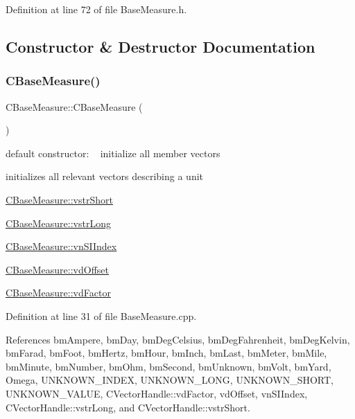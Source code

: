 Definition at line 72 of file Base\+Measure.\+h.



\subsection{Constructor \& Destructor Documentation}
\mbox{\label{classCBaseMeasure_a6a369b1e556d95a938b0e75647b5a602}} 
\subsubsection{\texorpdfstring{C\+Base\+Measure()}{CBaseMeasure()}}
{\footnotesize\ttfamily C\+Base\+Measure\+::\+C\+Base\+Measure (\begin{DoxyParamCaption}{ }\end{DoxyParamCaption})}



default constructor\+: ~\newline
 initialize all member vectors 

initializes all relevant vectors describing a unit


\begin{DoxyItemize}
\item \hyperlink{classCVectorHandle_afb50c8a33d4cf70bf92c644dca409ea2}{C\+Base\+Measure\+::vstr\+Short}
\item \hyperlink{classCVectorHandle_a71bec0e385b9ca8e5ffa174b559da9f8}{C\+Base\+Measure\+::vstr\+Long}
\item \hyperlink{classCBaseMeasure_aaaddf8a6ce321b282885953439472390}{C\+Base\+Measure\+::vn\+S\+I\+Index}
\item \hyperlink{classCBaseMeasure_a7220e3dfd4fbdd319a5c3c6af844259e}{C\+Base\+Measure\+::vd\+Offset}
\item \hyperlink{classCVectorHandle_af8f8b2e0da8363e695872ca85f33364e}{C\+Base\+Measure\+::vd\+Factor} 
\end{DoxyItemize}

Definition at line 31 of file Base\+Measure.\+cpp.



References bm\+Ampere, bm\+Day, bm\+Deg\+Celsius, bm\+Deg\+Fahrenheit, bm\+Deg\+Kelvin, bm\+Farad, bm\+Foot, bm\+Hertz, bm\+Hour, bm\+Inch, bm\+Last, bm\+Meter, bm\+Mile, bm\+Minute, bm\+Number, bm\+Ohm, bm\+Second, bm\+Unknown, bm\+Volt, bm\+Yard, Omega, U\+N\+K\+N\+O\+W\+N\+\_\+\+I\+N\+D\+EX, U\+N\+K\+N\+O\+W\+N\+\_\+\+L\+O\+NG, U\+N\+K\+N\+O\+W\+N\+\_\+\+S\+H\+O\+RT, U\+N\+K\+N\+O\+W\+N\+\_\+\+V\+A\+L\+UE, C\+Vector\+Handle\+::vd\+Factor, vd\+Offset, vn\+S\+I\+Index, C\+Vector\+Handle\+::vstr\+Long, and C\+Vector\+Handle\+::vstr\+Short.

